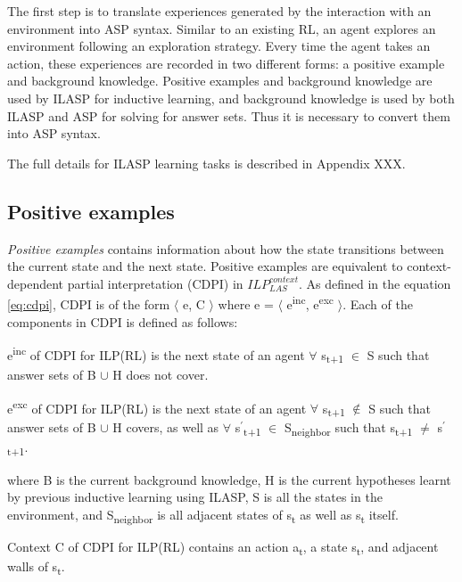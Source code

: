 The first step is to translate experiences generated by the interaction with an environment into ASP syntax. 
Similar to an existing RL, an agent explores an environment following an exploration strategy.
Every time the agent takes an action, these experiences are recorded in two different forms: 
a positive example and background knowledge. 
Positive examples and background knowledge are used by ILASP for inductive learning, and background knowledge is used by both ILASP and ASP for solving for answer sets.
Thus it is necessary to convert them into ASP syntax.

The full details for ILASP learning tasks is described in Appendix XXX.

\subsection{Positive examples}
\textit{Positive examples} contains information about how the state transitions between the current state and the next state.
Positive examples are equivalent to context-dependent partial interpretation (CDPI) in  $ILP_{LAS}^{context}$. 
As defined in the equation \ref{eq:cdpi}, CDPI is of the form $\langle$ e, C $\rangle$ where e = $\langle$ e\textsuperscript{inc}, e\textsuperscript{exc} $\rangle$. 
Each of the components in CDPI is defined as follows:
\begin{defn}
e\textsuperscript{inc} of CDPI for ILP(RL) is the next state of an agent $\forall$ s\textsubscript{t+1} $\in$ S such that answer sets of B $\cup$ H does not cover.
\end{defn}

\begin{defn} \label{def:ILPRL_context}
e\textsuperscript{exc} of CDPI for ILP(RL) is the next state of an agent $\forall$ s\textsubscript{t+1} $\not\in$ S such that answer sets of B $\cup$ H covers,
as well as $\forall$ s$^\prime$\textsubscript{t+1} $\in$ S\textsubscript{neighbor} such that s\textsubscript{t+1} $\neq$ s$^\prime$\textsubscript{t+1}.
\end{defn}
where B is the current background knowledge, H is the current hypotheses learnt by previous inductive learning using ILASP, S is all the states in the environment, and S\textsubscript{neighbor} is all adjacent states of s\textsubscript{t} as well as s\textsubscript{t} itself.

\begin{defn}
Context C of CDPI for ILP(RL) contains an action a\textsubscript{t}, a state s\textsubscript{t}, and adjacent walls of s\textsubscript{t}.
\label{def:context}
\end{defn}

